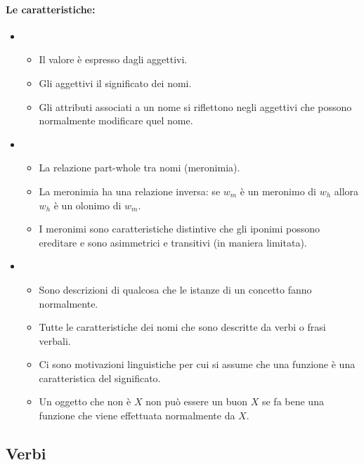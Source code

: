 \paragraph{Le caratteristiche:}

\begin{itemize}
  \item {}
    \begin{itemize}
      \item Il valore è espresso dagli aggettivi. 
      \item Gli aggettivi  il significato dei nomi. 
      \item Gli attributi associati a un nome si riflettono negli aggettivi che possono normalmente modificare quel nome.
    \end{itemize}
  \item {}
    \begin{itemize}
      \item La relazione part-whole tra nomi (meronimia). 
      \item La meronimia ha una relazione inversa: se $w_m$ è un meronimo di $w_h$ allora $w_h$ è un olonimo di $w_m$.
      \item I meronimi sono caratteristiche distintive che gli iponimi possono ereditare e sono asimmetrici e transitivi (in maniera limitata). 
    \end{itemize}
  \item {}
    \begin{itemize}
      \item Sono descrizioni di qualcosa che le istanze di un concetto fanno normalmente. 
      \item Tutte le caratteristiche dei nomi che sono descritte da verbi o frasi verbali. 
      \item Ci sono motivazioni linguistiche per cui si assume che una funzione è una caratteristica del significato. 
      \item Un oggetto che non è $X$ non può essere un buon $X$ se fa bene una funzione che viene effettuata normalmente da $X$. 
    \end{itemize}
\end{itemize}

\subsection{Verbi}


